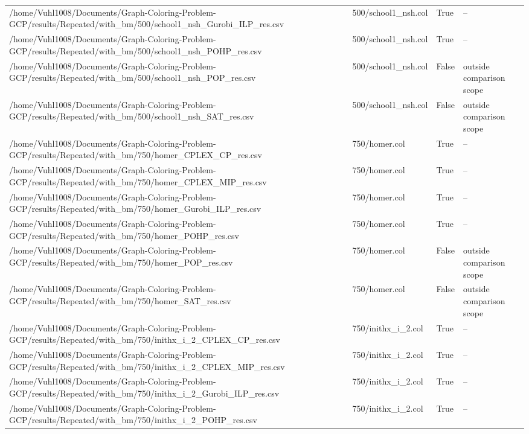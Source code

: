 \begin{table}[htbp]
\begin{tabular}{llll}
/home/Vuhl1008/Documents/Graph-Coloring-Problem-GCP/results/Repeated/with\_bm/500/school1\_nsh\_Gurobi\_ILP\_res.csv & 500/school1\_nsh.col & True & -- \\
/home/Vuhl1008/Documents/Graph-Coloring-Problem-GCP/results/Repeated/with\_bm/500/school1\_nsh\_POHP\_res.csv & 500/school1\_nsh.col & True & -- \\
/home/Vuhl1008/Documents/Graph-Coloring-Problem-GCP/results/Repeated/with\_bm/500/school1\_nsh\_POP\_res.csv & 500/school1\_nsh.col & False & outside comparison scope \\
/home/Vuhl1008/Documents/Graph-Coloring-Problem-GCP/results/Repeated/with\_bm/500/school1\_nsh\_SAT\_res.csv & 500/school1\_nsh.col & False & outside comparison scope \\
/home/Vuhl1008/Documents/Graph-Coloring-Problem-GCP/results/Repeated/with\_bm/750/homer\_CPLEX\_CP\_res.csv & 750/homer.col & True & -- \\
/home/Vuhl1008/Documents/Graph-Coloring-Problem-GCP/results/Repeated/with\_bm/750/homer\_CPLEX\_MIP\_res.csv & 750/homer.col & True & -- \\
/home/Vuhl1008/Documents/Graph-Coloring-Problem-GCP/results/Repeated/with\_bm/750/homer\_Gurobi\_ILP\_res.csv & 750/homer.col & True & -- \\
/home/Vuhl1008/Documents/Graph-Coloring-Problem-GCP/results/Repeated/with\_bm/750/homer\_POHP\_res.csv & 750/homer.col & True & -- \\
/home/Vuhl1008/Documents/Graph-Coloring-Problem-GCP/results/Repeated/with\_bm/750/homer\_POP\_res.csv & 750/homer.col & False & outside comparison scope \\
/home/Vuhl1008/Documents/Graph-Coloring-Problem-GCP/results/Repeated/with\_bm/750/homer\_SAT\_res.csv & 750/homer.col & False & outside comparison scope \\
/home/Vuhl1008/Documents/Graph-Coloring-Problem-GCP/results/Repeated/with\_bm/750/inithx\_i\_2\_CPLEX\_CP\_res.csv & 750/inithx\_i\_2.col & True & -- \\
/home/Vuhl1008/Documents/Graph-Coloring-Problem-GCP/results/Repeated/with\_bm/750/inithx\_i\_2\_CPLEX\_MIP\_res.csv & 750/inithx\_i\_2.col & True & -- \\
/home/Vuhl1008/Documents/Graph-Coloring-Problem-GCP/results/Repeated/with\_bm/750/inithx\_i\_2\_Gurobi\_ILP\_res.csv & 750/inithx\_i\_2.col & True & -- \\
/home/Vuhl1008/Documents/Graph-Coloring-Problem-GCP/results/Repeated/with\_bm/750/inithx\_i\_2\_POHP\_res.csv & 750/inithx\_i\_2.col & True & -- \\

\end{tabular}
\end{table}
